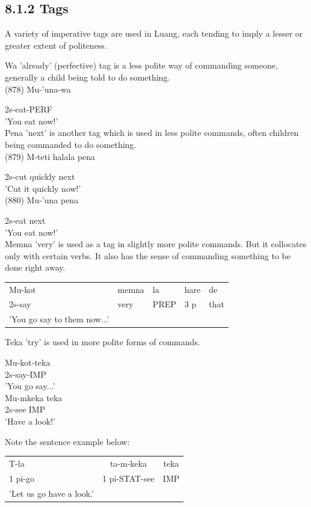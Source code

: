 \documentclass[10pt]{article}
\begin{document}
\subsection*{8.1.2 Tags}
A variety of imperative tags are used in Luang, each tending to imply a lesser or greater extent of politeness.

Wa 'already' (perfective) tag is a less polite way of commanding someone, generally a child being told to do something.\\
(878) Mu-'una-wa

2s-eat-PERF\\
'You eat now!'\\
Pena 'next' is another tag which is used in less polite commands, often children being commanded to do something.\\
(879) M-teti halala pena

2s-cut quickly next\\
'Cut it quickly now!'\\
(880) Mu-'una pena

2s-eat next\\
'You eat now!'\\
Memna 'very' is used as a tag in slightly more polite commands. But it collocates only with certain verbs. It also has the sense of commanding something to be done right away.

\begin{center}
\begin{tabular}{lllll}
Mu-kot & memna & la & hare & de \\
2s-say & very & PREP & 3 p & that \\
'You go say to them now...' &  &  &  &  \\
\end{tabular}
\end{center}

Teka 'try' is used in more polite forms of commands.

Mu-kot-teka\\
2s-say-IMP\\
'You go say...'\\
Mu-mkeka teka\\
2s-see IMP\\
'Have a look!'

Note the sentence example below:

\begin{center}
\begin{tabular}{lcc}
T-la & ta-m-keka & teka \\
1 pi-go & 1 pi-STAT-see & IMP \\
'Let us go have a look.' &  &  \\
\end{tabular}
\end{center}
\end{document}
